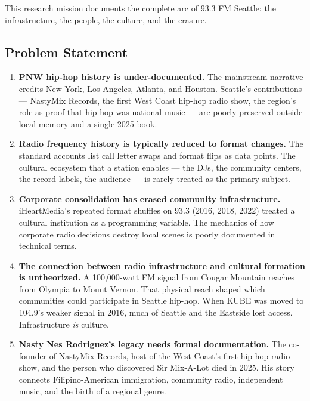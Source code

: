 \documentclass[11pt,letterpaper]{article}
\begin{document}
This research mission documents the complete arc of 93.3 FM Seattle: the infrastructure, the people, the culture, and the erasure.

\subsection{Problem Statement}

\begin{enumerate}[leftmargin=2em]
\item \textbf{PNW hip-hop history is under-documented.} The mainstream narrative credits New York, Los Angeles, Atlanta, and Houston. Seattle's contributions --- NastyMix Records, the first West Coast hip-hop radio show, the region's role as proof that hip-hop was national music --- are poorly preserved outside local memory and a single 2025 book.

\item \textbf{Radio frequency history is typically reduced to format changes.} The standard accounts list call letter swaps and format flips as data points. The cultural ecosystem that a station enables --- the DJs, the community centers, the record labels, the audience --- is rarely treated as the primary subject.

\item \textbf{Corporate consolidation has erased community infrastructure.} iHeartMedia's repeated format shuffles on 93.3 (2016, 2018, 2022) treated a cultural institution as a programming variable. The mechanics of how corporate radio decisions destroy local scenes is poorly documented in technical terms.

\item \textbf{The connection between radio infrastructure and cultural formation is untheorized.} A 100,000-watt FM signal from Cougar Mountain reaches from Olympia to Mount Vernon. That physical reach shaped which communities could participate in Seattle hip-hop. When KUBE was moved to 104.9's weaker signal in 2016, much of Seattle and the Eastside lost access. Infrastructure \textit{is} culture.

\item \textbf{Nasty Nes Rodriguez's legacy needs formal documentation.} The co-founder of NastyMix Records, host of the West Coast's first hip-hop radio show, and the person who discovered Sir Mix-A-Lot died in 2025. His story connects Filipino-American immigration, community radio, independent music, and the birth of a regional genre.
\end{enumerate}
\end{document}
